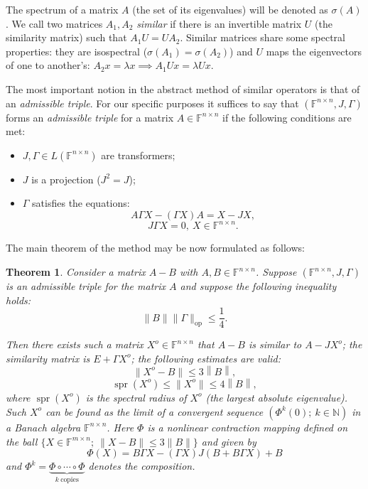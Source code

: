 \documentclass[14pt,a4paper]{extarticle}
\newtheorem{thm}{Theorem}
\theoremstyle{definition}
\begin{document}
The spectrum of a matrix \( A \)
    (the set of its eigenvalues)
    will be denoted as \( \sigma(A) \).
We call two matrices \( A_1, A_2 \) \emph{similar}
    if there is an invertible matrix \( U \)
    (the similarity matrix)
    such that \( A_1 U = U A_2 \).
Similar matrices share some spectral properties:
    they are isospectral (\( \sigma(A_1) = \sigma(A_2) \))
    and \( U \) maps the eigenvectors of one to another's:
    \( A_2 x = \lambda x \implies A_1 U x = \lambda U x \).

The most important notion
    in the abstract method of similar operators
    is that of an \emph{admissible triple}.
For our specific purposes it suffices to say
    that \( (\mathbb{F}^{n{\times}n}, J, \Gamma) \)
    forms an \emph{admissible triple}
    for a matrix \( A\in\mathbb{F}^{n{\times}n} \)
    if the following conditions are met:
\begin{itemize}
    \item \( J, \Gamma \in L(\mathbb{F}^{n{\times}n}) \)
        are transformers;
    \item \( J \) is a projection (\( J^2 = J \));
    \item  \( \Gamma \) satisfies the equations:
        \[
            A \Gamma X - (\Gamma X) A = X - JX,
        \]
        \[
            J\Gamma X = 0,\ X\in\mathbb{F}^{n{\times}n}.
        \]
\end{itemize}

The main theorem of the method
    may be now formulated as follows:

\begin{thm}
    Consider a matrix \( A - B \)
        with \( A, B \in \mathbb{F}^{n{\times}n} \).
    Suppose \( (\mathbb{F}^{n{\times}n}, J, \Gamma) \)
        is an admissible triple for the matrix \( A \)
        and suppose the following inequality holds:
        \[
            \|B\|\|\Gamma\|_{\mathrm{op}} \leq \frac14.
        \]

    Then there exists such a matrix \( X^o\in\mathbb{F}^{n{\times}n} \)
        that \( A - B \) is similar to \( A - J X^o \);
        the similarity matrix is \( E + \Gamma X^o \);
        the following estimates are valid:
        \[
            \|X^o - B\| \leq 3 \left\|B\right\|,
        \]
        \[
            \operatorname{spr}(X^o) \leq \|X^o\| \leq 4 \left\|B\right\|,
        \]
        where \( \operatorname{spr}(X^o) \)
        is the spectral radius of \( X^o \) (the largest absolute eigenvalue).
    Such \( X^o \) can be found as the limit of a convergent sequence
        \( \left( \Phi^k(0);\ k\in\mathbb{N} \right) \)
        in a Banach algebra \( \mathbb{F}^{n{\times}n} \).
        Here \( \Phi \) is a nonlinear contraction mapping
        defined on the ball \( \{X\in\mathbb{F}^{m{\times}n};\ \|X-B\|\leq 3\|B\| \} \)
        and given by
    \[
        \Phi(X) = B\Gamma X - (\Gamma X)J(B + B\Gamma X) + B
    \]
        and \( \Phi^k = \underbrace{\Phi\circ\cdots\circ\Phi}_{k\ \text{copies}} \)
        denotes the composition.
\end{thm}
\end{document}
